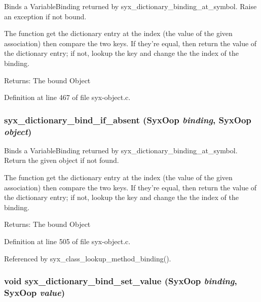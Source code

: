 Binds a VariableBinding returned by syx\_\-dictionary\_\-binding\_\-at\_\-symbol. Raise an exception if not bound.

The function get the dictionary entry at the index (the value of the given association) then compare the two keys. If they're equal, then return the value of the dictionary entry; if not, lookup the key and change the the index of the binding.

\begin{Desc}
\item[Returns:]The bound Object \end{Desc}


Definition at line 467 of file syx-object.c.\hypertarget{syx-object_8c_848c7464a13faa61d5fa8bb8f8a99688}{
\subsubsection{ syx\_\-dictionary\_\-bind\_\-if\_\-absent ({\bf SyxOop} {\em binding}, \/  {\bf SyxOop} {\em object})}}
\label{syx-object_8c_848c7464a13faa61d5fa8bb8f8a99688}


Binds a VariableBinding returned by syx\_\-dictionary\_\-binding\_\-at\_\-symbol. Return the given object if not found.

The function get the dictionary entry at the index (the value of the given association) then compare the two keys. If they're equal, then return the value of the dictionary entry; if not, lookup the key and change the the index of the binding.

\begin{Desc}
\item[Returns:]The bound Object \end{Desc}


Definition at line 505 of file syx-object.c.

Referenced by syx\_\-class\_\-lookup\_\-method\_\-binding().\hypertarget{syx-object_8c_b780a6826d077c055fc6714972723709}{
\subsubsection{\setlength{\rightskip}{0pt plus 5cm}void syx\_\-dictionary\_\-bind\_\-set\_\-value ({\bf SyxOop} {\em binding}, \/  {\bf SyxOop} {\em value})}}
\label{syx-object_8c_b780a6826d077c055fc6714972723709}


